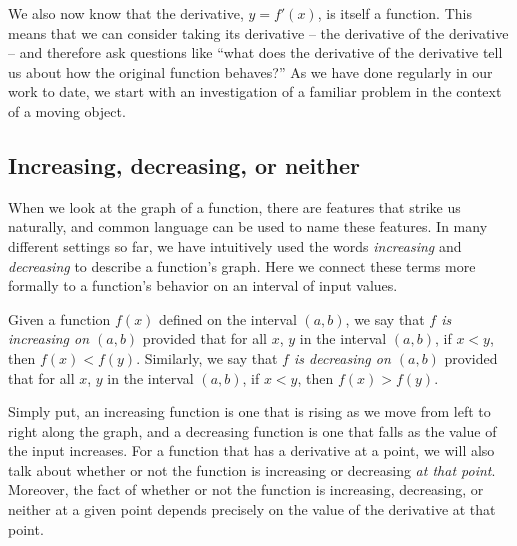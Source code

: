 We also now know that the derivative, $y = f'(x)$, is itself a function.  This means that we can consider taking its derivative -- the derivative of the derivative -- and therefore ask questions like ``what does the derivative of the derivative tell us about how the original function behaves?''  As we have done regularly in our work to date, we start with an investigation of a familiar problem in the context of a moving object.  



\subsection*{Increasing, decreasing, or neither}

When we look at the graph of a function, there are features that strike us naturally, and common language can be used to name these features.  In many different settings so far, we have intuitively used the words \emph{increasing} and \emph{decreasing} to describe a function's graph.  Here we connect these terms more formally to a function's behavior on an interval of input values.
\begin{definition}
Given a function $f(x)$ defined on the interval $(a,b)$, we say that \emph{$f$ is increasing on $(a,b)$} provided that for all $x$, $y$ in the interval $(a,b)$, if $x < y$, then $f(x) < f(y)$.  Similarly, we say that \emph{$f$ is decreasing on $(a,b)$} provided that for all $x$, $y$ in the interval $(a,b)$, if $x < y$, then $f(x) > f(y)$.
\end{definition}
Simply put, an increasing function is one that is rising as we move from left to right along the graph, and a decreasing function is one that falls as the value of the input increases.  For a function that has a derivative at a point, we will also talk about whether or not the function is increasing or decreasing \emph{at that point}.  Moreover, the fact of whether or not the function is increasing, decreasing, or neither at a given point depends precisely on the value of the derivative at that point.

\vspace*{5pt}
\nin {}
\vspace*{1pt}

